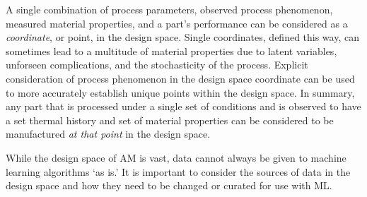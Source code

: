 A single combination of process parameters, observed process phenomenon, measured material properties, and a part's performance can be considered as a \textit{coordinate}, or point, in the design space. Single coordinates, defined this way, can sometimes lead to a multitude of material properties due to latent variables, unforseen complications, and the stochasticity of the process. Explicit consideration of process phenomenon in the design space coordinate can be used to more accurately establish unique points within the design space. In summary, any part that is processed under a single set of conditions and is observed to have a set thermal history and set of material properties can be considered to be manufactured \textit{at that point} in the design space.

While the design space of AM is vast, data cannot always be given to machine learning algorithms `as is.' It is important to consider the sources of data in the design space and how they need to be changed or curated for use with ML.
